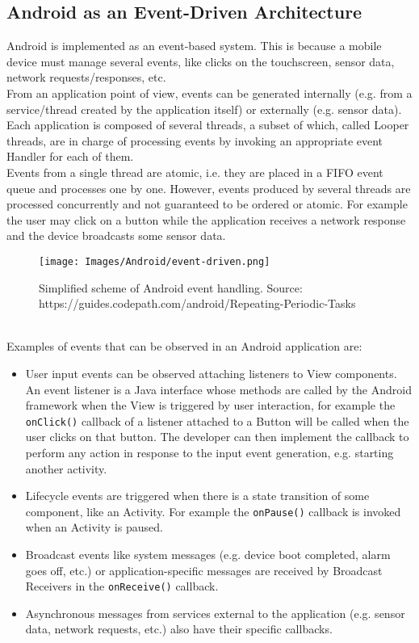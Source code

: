 \documentclass[11pt,a4paper,notitlepage]{article}
\begin{document}
\subsection{Android as an Event-Driven Architecture}
Android is implemented as an event-based system. This is because a mobile device must manage several events, like clicks on the touchscreen, sensor data, network requests/responses, etc.\bigskip \\
From an application point of view, events can be generated internally (e.g. from a service/thread created by the application itself) or externally (e.g. sensor data). Each application is composed of several threads, a subset of which, called Looper threads, are in charge of processing events by invoking an appropriate event Handler for each of them.\medskip \\
Events from a single thread are atomic, i.e. they are placed in a FIFO event queue and processes one by one. However, events produced by several threads are processed concurrently and not guaranteed to be ordered or atomic. For example the user may click on a button while the application receives a network response and the device broadcasts some sensor data.\medskip \\
\begin{figure}
  \centering
  \texttt{[image: Images/Android/event-driven.png]}
  \caption[Android event handling]{Simplified scheme of Android event handling. Source: https://guides.codepath.com/android/Repeating-Periodic-Tasks}
\end{figure}\\
Examples of events that can be observed in an Android application are:
\begin{itemize}
	\item User input events can be observed attaching listeners to View components. An event listener is a Java interface whose methods are called by the Android framework when the View is triggered by user interaction, for example the \texttt{onClick()} callback of a listener attached to a Button will be called when the user clicks on that button. The developer can then implement the callback to perform any action in response to the input event generation, e.g. starting another activity.
	\item Lifecycle events are triggered when there is a state transition of some component, like an Activity. For example the \texttt{onPause()} callback is invoked when an Activity is paused.
	\item Broadcast events like system messages (e.g. device boot completed, alarm goes off, etc.) or application-specific messages are received by Broadcast Receivers in the \texttt{onReceive()} callback.
	\item Asynchronous messages from services external to the application (e.g. sensor data, network requests, etc.) also have their specific callbacks.
\end{itemize}
\end{document}
